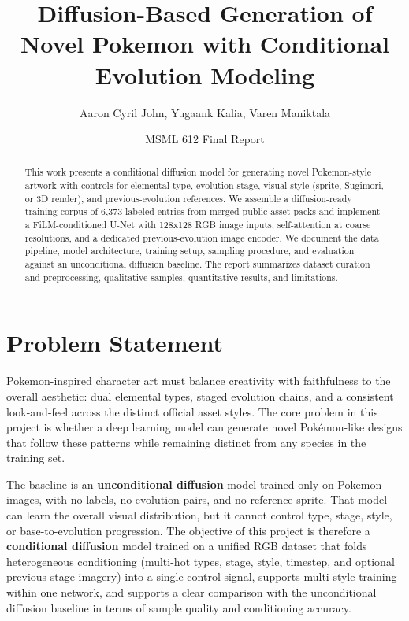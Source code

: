 \documentclass[
]{article}
\title{Diffusion-Based Generation of Novel Pokemon with Conditional
Evolution Modeling}
\author{Aaron Cyril John, Yugaank Kalia, Varen Maniktala}
\date{MSML 612 Final Report}
\begin{document}
\maketitle

\begin{abstract}

This work presents a conditional diffusion model for generating novel
Pokemon-style artwork with controls for elemental type, evolution stage,
visual style (sprite, Sugimori, or 3D render), and previous-evolution
references. We assemble a diffusion-ready training corpus of 6,373
labeled entries from merged public asset packs and implement a
FiLM-conditioned U-Net with 128x128 RGB image inputs, self-attention at
coarse resolutions, and a dedicated previous-evolution image encoder. We
document the data pipeline, model architecture, training setup, sampling
procedure, and evaluation against an unconditional diffusion baseline.
The report summarizes dataset curation and preprocessing, qualitative
samples, quantitative results, and limitations.

\end{abstract}
\section{Problem Statement}\label{problem-statement}

Pokemon-inspired character art must balance creativity with faithfulness 
to the overall aesthetic: dual elemental types, staged
evolution chains, and a consistent look-and-feel across the distinct
official asset styles. The core problem in this project is whether a deep 
learning model can generate novel Pokémon-like designs that follow these 
patterns while remaining distinct from any species in the training set.

The baseline is an \textbf{unconditional diffusion}
model trained only on Pokemon images, with no labels, no evolution pairs,
and no reference sprite. That model can learn the overall visual
distribution, but it cannot control type, stage, style, or
base-to-evolution progression. The objective of this project is
therefore a \textbf{conditional diffusion} model trained on a unified RGB dataset
that folds heterogeneous conditioning (multi-hot types, stage, style,
timestep, and optional previous-stage imagery) into a single control
signal, supports multi-style training within one network, and supports 
a clear comparison with the unconditional diffusion baseline in terms 
of sample quality and conditioning accuracy.
\end{document}
